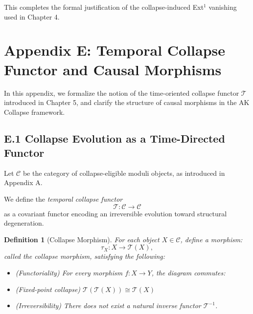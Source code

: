 \documentclass[11pt]{article}
\newtheorem{definition}[theorem]{Definition}
\begin{document}
This completes the formal justification of the collapse-induced Ext$^1$ vanishing used in Chapter 4.



\section*{Appendix E: Temporal Collapse Functor and Causal Morphisms}

In this appendix, we formalize the notion of the time-oriented collapse functor $\mathcal{T}$  
introduced in Chapter 5, and clarify the structure of causal morphisms in the AK Collapse framework.

\subsection*{E.1 Collapse Evolution as a Time-Directed Functor}

Let $\mathcal{C}$ be the category of collapse-eligible moduli objects, as introduced in Appendix A.

We define the \emph{temporal collapse functor}
\[
\mathcal{T} : \mathcal{C} \to \mathcal{C}
\]
as a covariant functor encoding an irreversible evolution toward structural degeneration.

\begin{definition}[Collapse Morphism]
For each object $X \in \mathcal{C}$, define a morphism:
\[
\tau_X : X \longrightarrow \mathcal{T}(X),
\]
called the \emph{collapse morphism}, satisfying the following:
\begin{itemize}
    \item (Functoriality) For every morphism $f : X \to Y$, the diagram commutes:
    
\begin{center}
\end{center}


    \item (Fixed-point collapse) $\mathcal{T}(\mathcal{T}(X)) \cong \mathcal{T}(X)$
    \item (Irreversibility) There does not exist a natural inverse functor $\mathcal{T}^{-1}$.
\end{itemize}
\end{definition}
\end{document}
